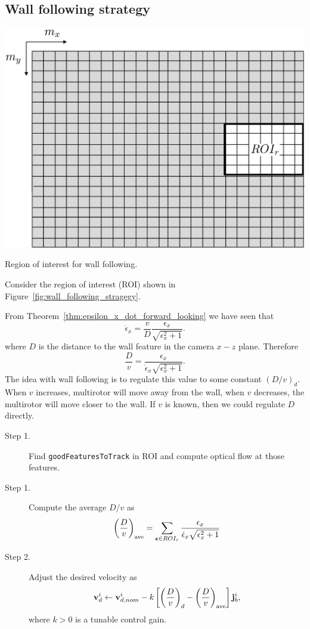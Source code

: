 \subsection{Wall following strategy}


\begin{marginfigure}
	\includegraphics[width=\linewidth]{chap7_optical_flow/figures/wall_following_strategy}
	\caption{Region of interest for wall following.}
	\label{fig:wall_following_stragegy}
\end{marginfigure}  

Consider the region of interest (ROI) shown in Figure~\ref{fig:wall_following_stragegy}.


From Theorem~\ref{thm:epsilon_x_dot_forward_looking} we have seen that 
\[
\dot{\epsilon}_x = \frac{v}{D}\frac{\epsilon_x}{\sqrt{\epsilon_x^2+1}}.
\]
where $D$ is the distance to the wall feature in the camera $x-z$ plane.  Therefore
\[
\frac{D}{v} = \frac{\epsilon_x}{\dot{\epsilon}_x\sqrt{\epsilon_x^2+1}}.
\]
The idea with wall following is to regulate this value to some constant $(D/v)_d$. When $v$ increases, multirotor will move away from the wall, when $v$ decreases, the multirotor will move closer to the wall.  If $v$ is known, then we could regulate $D$ directly.  

\begin{description}
	\item[Step 1.] Find \texttt{goodFeaturesToTrack} in ROI and compute optical flow at those features.
	\item[Step 1.]  Compute the average $D/v$ as
	\[
	\left(\frac{D}{v}\right)_{\text{ave}} = \sum_{\boldsymbol{\epsilon}\in ROI_r} \frac{\epsilon_x}{\dot{\epsilon}_x\sqrt{\epsilon_x^2+1}}
	\]
	\item[Step 2.] Adjust the desired velocity as
	\[
	\mathbf{v}_d^i \leftarrow \mathbf{v}_{d,nom}^i - k\left[\left(\frac{D}{v}\right)_d - \left(\frac{D}{v}\right)_{\text{ave}}\right] \mathbf{j}_b^i,
	\]
	where $k>0$ is a tunable control gain.
\end{description}

